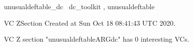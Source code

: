 \documentclass{article}
\begin{document}

\begin{zsection}	 \SECTION unusualdeftable\_dc \parents~dc\_toolkit , unusualdeftable
\end{zsection}

\newcommand{\appliesTo}{\zbinop{appliesTo}} 
\newcommand{\appliesToNofix}{\zpreop{appliesToNofix}} 

VC ZSection Created at Sun Oct 18 08:41:43 UTC 2020.



 VC Z section "unusualdeftableARGdc" has $0$ interesting VCs.



\end{document}
